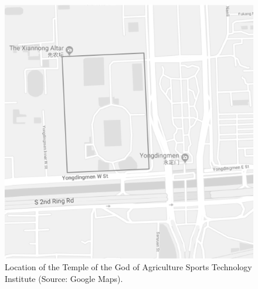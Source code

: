 \begin{CJK}{UTF8}{gbsn}
\begin{figure}[htbp]
  \centering
  \includegraphics[scale =.5]{images/beijingXNT.png}
  \caption{Location of the Temple of the God of Agriculture Sports Technology Institute  (Source: Google Maps).}
  \label{fig:beijingXNT}
\end{figure}



\end{CJK}
